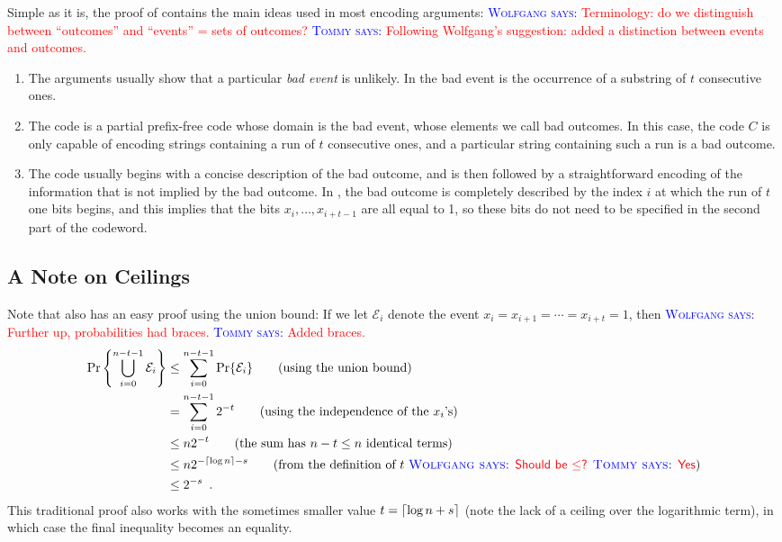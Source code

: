 \documentclass{patmorin}
\newcommand{\aremark}[3]{\textcolor{blue}{\textsc{#1 #2:}}
  \textcolor{red}{\textsf{#3}}}
\newcommand{\tommy}[2][says]{\aremark{Tommy}{#1}{#2}}
\newcommand{\wolfgang}[2][says]{\aremark{Wolfgang}{#1}{#2}}
\begin{document}
Simple as it is, the proof of  contains the main ideas
used in most encoding arguments: \wolfgang{Terminology: do we
  distinguish between ``outcomes'' and ``events'' = sets of outcomes?}
\tommy{Following Wolfgang's suggestion: added a distinction between
  events and outcomes.}
\begin{enumerate}
\item The arguments usually show that a particular \emph{bad event} is
  unlikely. In  the bad event is the occurrence of a
  substring of $t$ consecutive ones.

\item The code is a partial prefix-free code whose domain is the bad
  event, whose elements we call bad outcomes. In this case, the code
  $C$ is only capable of encoding strings containing a run of $t$
  consecutive ones, and a particular string containing such a run is a
  bad outcome.

\item The code usually begins with a concise description of the bad
  outcome, and is then followed by a straightforward encoding of the
  information that is not implied by the bad outcome. In
  , the bad outcome is completely described by the index
  $i$ at which the run of $t$ one bits begins, and this implies that
  the bits $x_i,\ldots,x_{i+t-1}$ are all equal to 1, so these bits do
  not need to be specified in the second part of the codeword.
\end{enumerate}

\subsection{A Note on Ceilings}

Note that  also has an easy proof using the union
bound: If we let $\mathcal{E}_i$ denote the event
$x_i=x_{i+1}=\cdots=x_{i+t}=1$, then
\wolfgang{Further up, probabilities had braces.} \tommy{Added braces.}
\begin{align*}
  \Pr \left\{\bigcup_{i=0}^{n-t-1} \mathcal{E}_i\right\}
  & \le \sum_{i=0}^{n-t-1} \Pr \{\mathcal{E}_i\}  \tag{using the union bound}\\
  & = \sum_{i=0}^{n-t-1} 2^{-t}  \tag{using the independence of the $x_i$'s}\\
  & \le n2^{-t}  \tag{the sum has $n-t\le n$ identical terms}\\
  & \le n2^{-\lceil\log n\rceil-s}  \tag{from the definition of $t$ \wolfgang{Should be $\le$?} \tommy{Yes}}\\
  & \le 2^{-s} \enspace .
\end{align*}
This traditional proof also works with the sometimes smaller value
$t={\lceil \log n+s \rceil}$ (note the lack of a ceiling over the logarithmic
term), in which case the final inequality becomes an equality.
\end{document}
